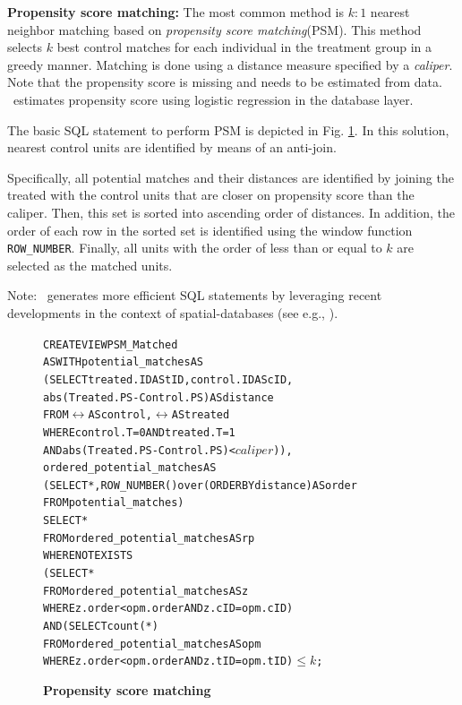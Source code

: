 {\bf Propensity score matching:}
\label{sec:nnm}
The most common method is $k:1$ nearest neighbor
matching based on {\em propensity score matching}(PSM). This method selects $k$
best control matches for each individual
in the treatment group in a greedy manner. Matching is
done using a distance measure specified by a {\em caliper}. Note that the propensity score
is missing and needs to be estimated from data.
\GSQL\ estimates propensity score using logistic regression in the database layer.

The basic SQL statement to perform PSM
is depicted in Fig. \ref{fig:nnmnr}.
In this solution,
nearest control units are identified
by means of an anti-join.  Specifically, all potential matches and their distances are identified by
joining the treated with the control units that are closer on propensity score than
the caliper. Then, this set is sorted into ascending order of
distances.  In addition, the order of each row in the sorted set is identified
using the window function {\verb|ROW_NUMBER|}. Finally, all units with the order of less than or equal to $k$ are selected as the matched units.

Note: \GSQL\  generates more efficient SQL statements by
leveraging recent developments in the context of spatial-databases
(see e.g., \cite{obe2015postgis}).



\begin{figure} 
  \centering
\begin{alltt} \tiny
CREATE VIEW PSM_Matched
AS WITH potential_matches AS
  (SELECT treated.ID AS tID, control.ID AS cID,
          abs(Treated.PS-Control.PS)  AS distance
   FROM \(\rel\) AS control, \(\rel\) AS treated
   WHERE control.T=0 AND treated.T=1
     AND abs(Treated.PS-Control.PS) < \(caliper\))),
            ordered_potential_matches AS
  (SELECT *, ROW_NUMBER() over (ORDER BY distance) AS order
   FROM potential_matches)
SELECT *
FROM ordered_potential_matches AS rp
WHERE NOT EXISTS
    (SELECT *
     FROM ordered_potential_matches AS z
     WHERE z.order < opm.order AND z.cID=opm.cID)
  AND (SELECT count(*)
     FROM ordered_potential_matches AS opm
     WHERE z.order < opm.order AND z.tID=opm.tID)\( \leq k\);
\end{alltt} \vspace{-.3cm}
  \caption{\bf Propensity score matching}\label{fig:nnmnr}
\end{figure}



